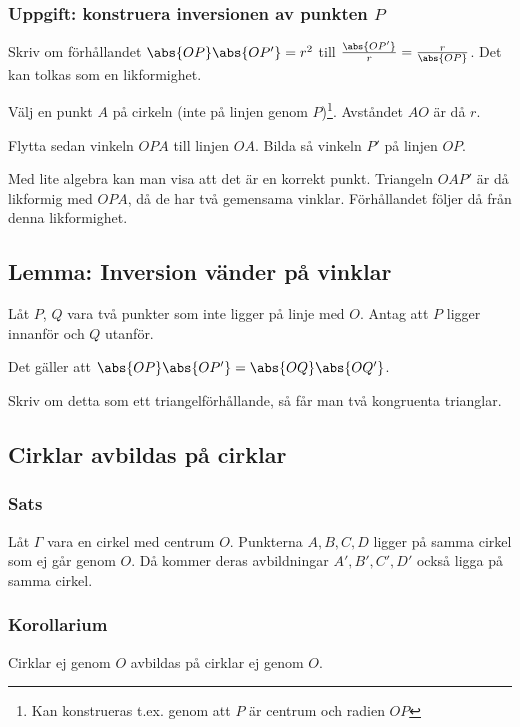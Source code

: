 \subsubsection{Uppgift: konstruera inversionen av punkten $P$}
Skriv om förhållandet $\abs{OP} \abs{OP'} = r^2$ till $\frac{\abs{OP'}}{r} = \frac{r}{\abs{OP}}$. Det kan tolkas som en likformighet.

Välj en punkt $A$ på cirkeln (inte på linjen genom $P$)\footnote{Kan konstrueras t.ex. genom att $P$ är centrum och radien $OP$}. Avståndet $AO$ är då $r$. 

Flytta sedan vinkeln $OPA$ till linjen $OA$. Bilda så vinkeln $P'$ på linjen $OP$.

Med lite algebra kan man visa att det är en korrekt punkt. Triangeln $OAP'$ är då likformig med $OPA$, då de har två gemensama vinklar. Förhållandet följer då från denna likformighet.

\subsection{Lemma: Inversion vänder på vinklar}
Låt $P$, $Q$ vara två punkter som inte ligger på linje med $O$. Antag att $P$ ligger innanför och $Q$ utanför. 

Det gäller att $\abs{OP}\abs{OP'} = \abs{OQ} \abs{OQ'}$.

Skriv om detta som ett triangelförhållande, så får man två kongruenta trianglar.

\subsection{Cirklar avbildas på cirklar}

\subsubsection{Sats}
Låt $\Gamma$ vara en cirkel med centrum $O$. Punkterna $A,B,C,D$ ligger på samma cirkel som ej går genom $O$. Då kommer deras avbildningar $A',B',C',D'$ också ligga på samma cirkel.


\subsubsection{Korollarium}
Cirklar ej genom $O$ avbildas på cirklar ej genom $O$.

